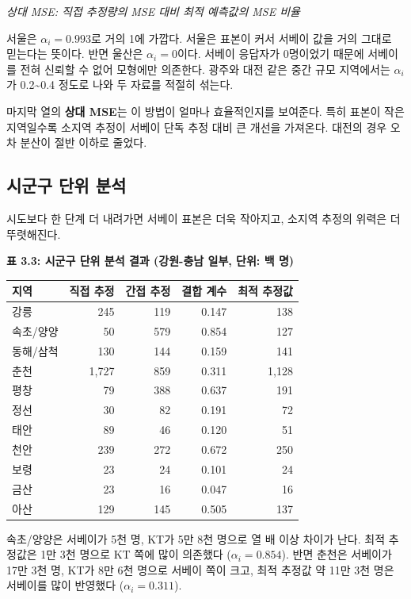\documentclass[
  letterpaper,
  DIV=11,
  numbers=noendperiod]{scrreprt}
\newcounter{none} %
\begin{document}
\emph{상대 MSE: 직접 추정량의 MSE 대비 최적 예측값의 MSE 비율}

서울은 \(\alpha_i = 0.993\)로 거의 1에 가깝다. 서울은 표본이 커서 서베이
값을 거의 그대로 믿는다는 뜻이다. 반면 울산은 \(\alpha_i = 0\)이다.
서베이 응답자가 0명이었기 때문에 서베이를 전혀 신뢰할 수 없어 모형에만
의존한다. 광주와 대전 같은 중간 규모 지역에서는 \(\alpha_i\)가
0.2\textasciitilde0.4 정도로 나와 두 자료를 적절히 섞는다.

마지막 열의 \textbf{상대 MSE}는 이 방법이 얼마나 효율적인지를 보여준다.
특히 표본이 작은 지역일수록 소지역 추정이 서베이 단독 추정 대비 큰
개선을 가져온다. 대전의 경우 오차 분산이 절반 이하로 줄었다.

\subsection{시군구 단위
분석}\label{uxc2dcuxad70uxad6c-uxb2e8uxc704-uxbd84uxc11d}

시도보다 한 단계 더 내려가면 서베이 표본은 더욱 작아지고, 소지역 추정의
위력은 더 뚜렷해진다.

\textbf{표 3.3: 시군구 단위 분석 결과 (강원-충남 일부, 단위: 백 명)}

{\def\LTcaptype{none} %
\begin{longtable}[]{@{}lrrrr@{}}
\toprule\noalign{}
지역 & 직접 추정 & 간접 추정 & 결합 계수 & 최적 추정값 \\
\midrule\noalign{}
\endhead
\bottomrule\noalign{}
\endlastfoot
강릉 & 245 & 119 & 0.147 & 138 \\
속초/양양 & 50 & 579 & 0.854 & 127 \\
동해/삼척 & 130 & 144 & 0.159 & 141 \\
춘천 & 1,727 & 859 & 0.311 & 1,128 \\
평창 & 79 & 388 & 0.637 & 191 \\
정선 & 30 & 82 & 0.191 & 72 \\
태안 & 89 & 46 & 0.120 & 51 \\
천안 & 239 & 272 & 0.672 & 250 \\
보령 & 23 & 24 & 0.101 & 24 \\
금산 & 23 & 16 & 0.047 & 16 \\
아산 & 129 & 145 & 0.505 & 137 \\
\end{longtable}
}

속초/양양은 서베이가 5천 명, KT가 5만 8천 명으로 열 배 이상 차이가 난다.
최적 추정값은 1만 3천 명으로 KT 쪽에 많이 의존했다
(\(\alpha_i = 0.854\)). 반면 춘천은 서베이가 17만 3천 명, KT가 8만 6천
명으로 서베이 쪽이 크고, 최적 추정값 약 11만 3천 명은 서베이를 많이
반영했다 (\(\alpha_i = 0.311\)).
\end{document}
